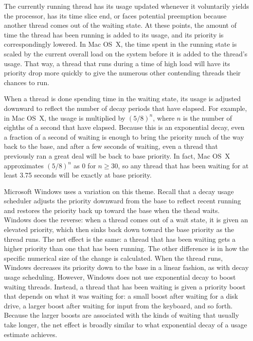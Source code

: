 The currently running thread has its usage updated whenever it voluntarily yields the
processor, has its time slice end, or faces potential preemption
because another thread comes out of the waiting state.  At these
points, the amount of time the thread has
been running is added to its usage, and its priority is correspondingly lowered.  In
Mac OS~X, the time spent in the running state is scaled by the current
overall load on the system before it is added to the thread's usage.
That way, a thread that runs during a time of high load will have its
priority drop more quickly to give the numerous other
contending threads their chances to run.

When a thread is done spending time in the waiting state, its usage is
adjusted downward to reflect the number of decay periods that have
elapsed.  For example, in Mac OS~X, the usage is multiplied by
$(5/8)^n$, where $n$ is the number of eighths of a second that have
elapsed.  Because this is an exponential decay, even a fraction of a
second of waiting is enough to bring the priority much of the way back
to the base, and after a few seconds of waiting, even a thread that
previously ran a great deal will be back to base priority.  In fact,
Mac OS~X approximates $(5/8)^n$ as 0 for $n \geq 30$, so any thread
that has been waiting for at least 3.75 seconds will be exactly at
base priority.

Microsoft Windows uses a variation on this theme.  Recall that a decay
usage scheduler adjusts the priority downward from the base to reflect
recent running and restores the priority back up toward the base
when the thead waits.  Windows does the reverse: when a thread comes
out of a wait state, it is given an elevated priority, which then
sinks back down toward the base priority as the thread runs.  The net
effect is the same: a thread that has been waiting gets a higher
priority than one that has been running.  The other difference is in
how the specific numerical size of the change is calculated.  When the
thread runs, Windows decreases its priority down to the base in a
linear fashion, as with decay usage scheduling.  However, Windows does
not use exponential decay to boost waiting threads.  Instead, a thread
that has been waiting is given a priority boost that depends on what
it was waiting for: a small boost after waiting for a disk drive, a
larger boost after waiting for input from the keyboard, and so forth.  Because
the larger boosts are associated with the kinds of waiting that
usually take longer, the net effect is broadly similar to what
exponential decay of a usage estimate achieves.

